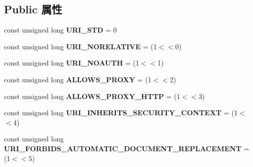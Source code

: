 \subsection*{Public 属性}
\begin{DoxyCompactItemize}
\item 
\mbox{\label{interfacens_i_protocol_handler_a3320a6648faf075e4d6319cc642977dc}} 
const unsigned long {\bfseries U\+R\+I\+\_\+\+S\+TD} = 0
\item 
\mbox{\label{interfacens_i_protocol_handler_ae58e808d4eb69a0459866430154812d3}} 
const unsigned long {\bfseries U\+R\+I\+\_\+\+N\+O\+R\+E\+L\+A\+T\+I\+VE} = (1$<$$<$0)
\item 
\mbox{\label{interfacens_i_protocol_handler_a1d72d7e9a0471f22718a5b3844364df4}} 
const unsigned long {\bfseries U\+R\+I\+\_\+\+N\+O\+A\+U\+TH} = (1$<$$<$1)
\item 
\mbox{\label{interfacens_i_protocol_handler_ae300e0fc4d1634f030b86a3df2282a29}} 
const unsigned long {\bfseries A\+L\+L\+O\+W\+S\+\_\+\+P\+R\+O\+XY} = (1$<$$<$2)
\item 
\mbox{\label{interfacens_i_protocol_handler_af6794b11ddafc126911c0a25b89e381a}} 
const unsigned long {\bfseries A\+L\+L\+O\+W\+S\+\_\+\+P\+R\+O\+X\+Y\+\_\+\+H\+T\+TP} = (1$<$$<$3)
\item 
\mbox{\label{interfacens_i_protocol_handler_a65dc42993a730fc0ac6a9604d02fe6f6}} 
const unsigned long {\bfseries U\+R\+I\+\_\+\+I\+N\+H\+E\+R\+I\+T\+S\+\_\+\+S\+E\+C\+U\+R\+I\+T\+Y\+\_\+\+C\+O\+N\+T\+E\+XT} = (1$<$$<$4)
\item 
\mbox{\label{interfacens_i_protocol_handler_a8d1f5980a4b3db03a34c798f4fcbd167}} 
const unsigned long {\bfseries U\+R\+I\+\_\+\+F\+O\+R\+B\+I\+D\+S\+\_\+\+A\+U\+T\+O\+M\+A\+T\+I\+C\+\_\+\+D\+O\+C\+U\+M\+E\+N\+T\+\_\+\+R\+E\+P\+L\+A\+C\+E\+M\+E\+NT} = (1$<$$<$5)
\item 
\mbox{\label{interfacens_i_protocol_handler_aa93b5376b8c52532ebe15097208592de}} 

\end{DoxyCompactItemize}
